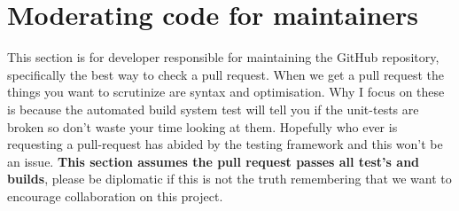 \section{Moderating code for maintainers\label{sec:Maintaining}}

This section is for developer responsible for maintaining the GitHub repository, specifically the best way to check a pull request. When we get a pull request the things you want to scrutinize are syntax and optimisation. Why I focus on these is because the automated build system test will tell you if the unit-tests are broken so don't waste your time looking at them. Hopefully who ever is requesting a pull-request has abided by the testing framework and this won't be an issue. \textbf{This section assumes the pull request passes all test's and builds}, please be diplomatic if this is not the truth remembering that we want to encourage collaboration on this project.


